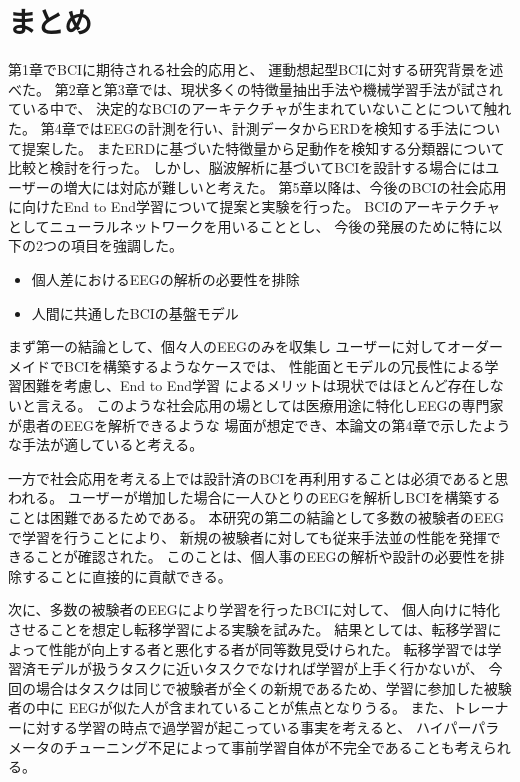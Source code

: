 \section{\mc まとめ}
第1章でBCIに期待される社会的応用と、
運動想起型BCIに対する研究背景を述べた。
第2章と第3章では、現状多くの特徴量抽出手法や機械学習手法が試されている中で、
決定的なBCIのアーキテクチャが生まれていないことについて触れた。
第4章ではEEGの計測を行い、計測データからERDを検知する手法について提案した。
またERDに基づいた特徴量から足動作を検知する分類器について比較と検討を行った。
しかし、脳波解析に基づいてBCIを設計する場合にはユーザーの増大には対応が難しいと考えた。
第5章以降は、今後のBCIの社会応用に向けたEnd to End学習について提案と実験を行った。
BCIのアーキテクチャとしてニューラルネットワークを用いることとし、
今後の発展のために特に以下の2つの項目を強調した。
\begin{itemize}
    \item 個人差におけるEEGの解析の必要性を排除
    \item 人間に共通したBCIの基盤モデル
\end{itemize}
まず第一の結論として、個々人のEEGのみを収集し
ユーザーに対してオーダーメイドでBCIを構築するようなケースでは、
性能面とモデルの冗長性による学習困難を考慮し、End to End学習
によるメリットは現状ではほとんど存在しないと言える。
このような社会応用の場としては医療用途に特化しEEGの専門家が患者のEEGを解析できるような
場面が想定でき、本論文の第4章で示したような手法が適していると考える。

一方で社会応用を考える上では設計済のBCIを再利用することは必須であると思われる。
ユーザーが増加した場合に一人ひとりのEEGを解析しBCIを構築することは困難であるためである。
本研究の第二の結論として多数の被験者のEEGで学習を行うことにより、
新規の被験者に対しても従来手法並の性能を発揮できることが確認された。
このことは、個人事のEEGの解析や設計の必要性を排除することに直接的に貢献できる。

次に、多数の被験者のEEGにより学習を行ったBCIに対して、
個人向けに特化させることを想定し転移学習による実験を試みた。
結果としては、転移学習によって性能が向上する者と悪化する者が同等数見受けられた。
転移学習では学習済モデルが扱うタスクに近いタスクでなければ学習が上手く行かないが、
今回の場合はタスクは同じで被験者が全くの新規であるため、学習に参加した被験者の中に
EEGが似た人が含まれていることが焦点となりうる。
また、トレーナーに対する学習の時点で過学習が起こっている事実を考えると、
ハイパーパラメータのチューニング不足によって事前学習自体が不完全であることも考えられる。



